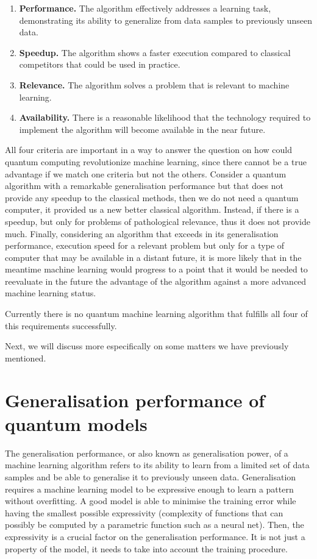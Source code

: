 \begin{enumerate}
    \item \textbf{Performance. } The algorithm effectively addresses a learning task, demonstrating its ability to generalize from data samples to previously unseen data.

    \item \textbf{Speedup. } The algorithm shows a faster execution compared to classical competitors that could be used in practice.

    \item  \textbf{Relevance. } The algorithm solves a problem that is relevant to machine learning.

    \item \textbf{Availability. } There is a reasonable likelihood that the technology required to implement the algorithm will become available in the near future.
\end{enumerate}

All four criteria are important in a way to answer the question on how could quantum computing revolutionize machine learning, since there cannot be a true advantage if we match one criteria but not the others. Consider a quantum algorithm with a remarkable generalisation performance but that does not provide any speedup to the classical methods, then we do not need a quantum computer, it provided us a new better classical algorithm. Instead, if there is a speedup, but only for problems of pathological relevance, thus it does not provide much. Finally, considering an algorithm that exceeds in its generalisation performance, execution speed for a relevant problem but only for a type of computer that may be available in a distant future, it is more likely that in the meantime machine learning would progress to a point that it would be needed to reevaluate in the future the advantage of the algorithm against a more advanced machine learning status. 

Currently there is no quantum machine learning algorithm that fulfills all four of this requirements successfully. 

Next, we will discuss more especifically on some matters we have previously mentioned.

\section{Generalisation performance of quantum models}

The generalisation performance, or also known as generalisation power, of a machine learning algorithm refers to its ability to learn from a limited set of data samples and be able to generalise it to previously unseen data. Generalisation requires a machine learning model to be expressive enough to learn a pattern without overfitting. A good model is able to minimise the training error while having the smallest possible expressivity (complexity of functions that can possibly be computed by a parametric function such as a neural net). Then, the expressivity is a crucial factor on the generalisation performance. It is not just a property of the model, it needs to take into account the training procedure. 

